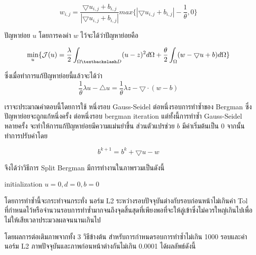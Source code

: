 \documentclass[hidelinks,a4paper,14pt]{article}
\numberwithin{equation}{section}							%
\begin{document}
{				$$ w_{i,j} = \frac{\bigtriangledown u_{i,j}  + b_{i,j} }{ | \bigtriangledown u_{i,j}  + b_{i,j} | } max \{  | \bigtriangledown u_{i,j}  + b_{i,j} | - \frac{1}{\theta} , 0\} $$
				
			ปัญหาย่อย $u$ โดยการคงค่า $w$ ไว้จะได้ว่าปัญหาย่อยคือ

				$$\min_{u} \{ \mathcal{J}(u) = \frac{\lambda}{2} \int_{\Omega \textbackslash D} (u-z)^2 d\Omega + \frac{\theta}{2} \int_{\Omega} (w - \bigtriangledown u + b) d\Omega \}$$
				
			ซึ่งเมื่อทำการแก้ปัญหาย่อยนี้แล้วจะได้ว่า
			$$ \frac{1}{\theta}\lambda u - \bigtriangleup u = \frac{1}{\theta} \lambda z - \bigtriangledown \cdot (w-b) $$
			
			เราจะประมาณคำตอบนี้โดยการใช้ หนึ่งรอบ Gauss-Seidel ต่อหนึ่งรอบการทำซ้ำของ Bergman ซึ่งปัญหาย่อยจะถูกแก้หนึ่งครั้ง ต่อหนึ่งรอบ bergman iteration แต่ทั้งนี้การทำซ้ำ Gauss-Seidel หลายครั้ง จะทำให้การแก้ปัญหาย่อยมีความแม่นยำขึ้น
			ส่วนตัวแปรช่วย $b$ มีค่าเริ่มต้นเป็น 0 จากนั้นทำการปรับค่าโดย
			
			$$ b^{k+1} = b^k  + \bigtriangledown u - w $$
						
			จึงได้ว่าวิธีการ Split Bergman มีการทำงานในภาพรวมเป็นดังนี้
			
			
			
			\begin{algorithm}[H]
				\begin{framed}
					initialization $u = 0, d = 0, b = 0$\\
				\end{framed}
			\end{algorithm}
			
			
			
			โดยการทำซ้ำนี้จะกระทำจนกระทั่ง นอร์ม L2 ระหว่างรอบปัจจุบันต่างกับรอบก่อนหน้าไม่เกินค่า Tol ที่กำหนดไว้หรือจำนวนรอบการทำซ้ำมากจนถึงจุดสิ้นสุดที่เพียงพอที่จะให้ลู่เข้าซึ่งไม่ควรใหญ่เกินไปเพื่อไม่ให้เสียเวลาประมวลผลจนนานเกินไป 

			โดยผลการต่อเติมภาพจากทั้ง 3 วิธีข้างต้น สำหรับการกำหนดรอบการทำซ้ำไม่เกิน 1000 รอบและค่านอร์ม L2 ภาพปัจจุบันและภาพก่อนหน้าต่างกันไม่เกิน 0.0001 ได้ผลลัพธ์ดังนี้
			
}
\end{document}
